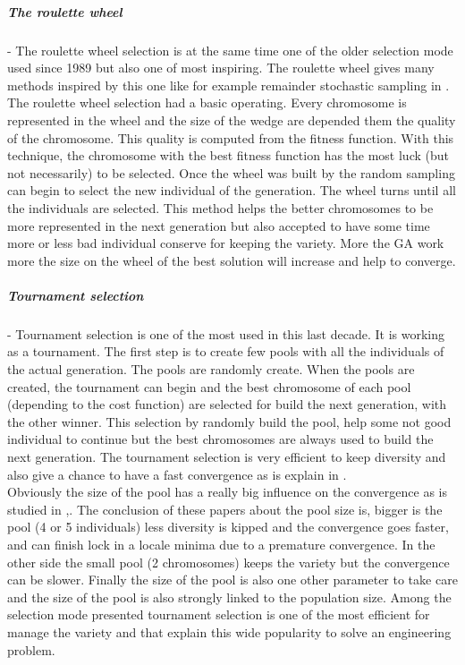 \subparagraph{The roulette wheel}
-	The roulette wheel selection is at the same time one of the older selection mode used since 1989 but also one of most inspiring.  The roulette wheel  gives many methods inspired by this one like for example remainder stochastic sampling in  \cite{138*whitley1994}. The roulette wheel selection had a basic operating. Every chromosome is represented in the wheel and the size of the wedge are depended them the quality of the chromosome. This quality is computed from the fitness function.  With this technique, the chromosome with the best fitness function has the most luck (but not necessarily) to be selected. 
Once the wheel was built by the random sampling can begin to select the new individual of the generation.  The wheel turns until all the individuals are selected.  
This method helps the better chromosomes to be more represented in the next generation but also accepted to have some time more or less bad individual conserve for keeping the variety. More the GA work more the size on the wheel of the best solution will increase and help to converge. \\

\subparagraph{Tournament selection}
-	Tournament selection is one of the most used  in this last decade. It is working as a tournament. 
The first step is to create few pools with all the individuals of the actual generation. The pools are randomly create.
 When the pools are created, the tournament can begin and the best chromosome of each pool (depending to the cost function) are selected for build the next generation, with the other winner. 
 This selection by randomly build the pool, help some not good individual to continue but the best chromosomes are always used to build the next generation. The tournament selection is very efficient to keep diversity and also give a chance to have a fast convergence as is explain in \cite{64*matsui1999}. \\ 
 Obviously the size of the pool has a really big influence on the convergence as is studied in ,\cite{64*matsui1999,95*miller1995}. The conclusion of these papers about the pool size  is, bigger is  the pool (4 or 5 individuals) less diversity is kipped and the convergence goes faster, and can finish lock in a locale minima due to a premature convergence.
  In the other side the small pool (2 chromosomes) keeps the variety but the convergence can be slower. 
  Finally the size of the pool is also one other parameter to take care and the size of the pool is also strongly linked to the population size.
Among the selection mode presented tournament selection is one of the most efficient  for manage the  variety and that explain this  wide popularity to solve an engineering problem. \\ 

